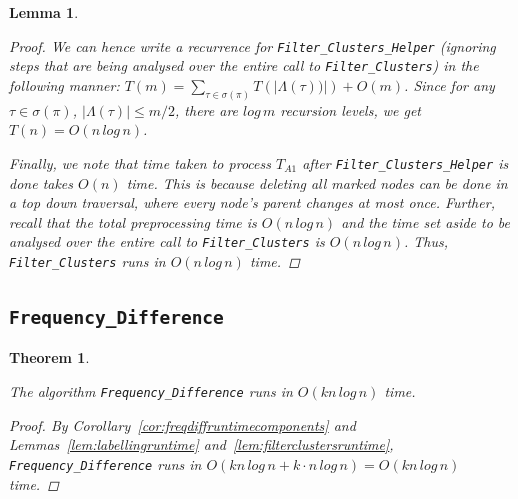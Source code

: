 \documentclass{article}
\newcommand{\leafset}{\Lambda}
\newtheorem{filterclustersruntime}[incompatibility]{Lemma}
\newtheorem{freqdiffruntime}[incompatibility]{Theorem}
\begin{document}
\begin{filterclustersruntime}
\begin{proof}
            We can hence write a recurrence for \texttt{Filter\_Clusters\_Helper} (ignoring steps that are being analysed over the entire call to \texttt{Filter\_Clusters}) in the following manner: $T(m) = \sum_{\tau \in \sigma(\pi)}T(|\leafset(\tau))|) + O(m)$. Since for any $\tau \in \sigma(\pi)$, $|\leafset(\tau)| \leq m/2$, there are $log\,m$ recursion levels, we get $T(n) = O(n\,log\,n)$.

            Finally, we note that time taken to process $T_{A1}$ after \texttt{Filter\_Clusters\_Helper} is done takes $O(n)$ time. This is because deleting all marked nodes can be done in a top down traversal, where every node's parent changes at most once. Further, recall that the total preprocessing time is $O(n\,log\,n)$ and the time set aside to be analysed over the entire call to \texttt{Filter\_Clusters} is $O(n\,log\,n)$. Thus, \texttt{Filter\_Clusters} runs in $O(n\,log\,n)$ time.
        \end{proof}
    \end{filterclustersruntime}

    \subsection{\texttt{Frequency\_Difference}}

    \begin{freqdiffruntime}
        \label{theorem:freqdiffruntime}

        The algorithm \texttt{Frequency\_Difference} runs in $O(kn\,log\,n)$ time.

        \begin{proof}
            By Corollary~\ref{cor:freqdiffruntimecomponents} and Lemmas~\ref{lem:labellingruntime} and~\ref{lem:filterclustersruntime}, \texttt{Frequency\_Difference} runs in $O(kn\,log\,n + k \cdot n\,log\,n) = O(kn\,log\,n)$ time.
        \end{proof}
    \end{freqdiffruntime}

    \newpage
    
    
\end{document}
